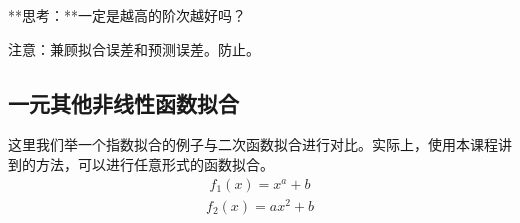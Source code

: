 \documentclass[letterpaper,10pt,english]{sphinxmanual}
\begin{document}
\noindent{}

**思考：**一定是越高的阶次越好吗？


注意：兼顾拟合误差和预测误差。防止。


\subsection{一元其他非线性函数拟合}
\label{\detokenize{docs/prediction_model:id9}}
这里我们举一个指数拟合的例子与二次函数拟合进行对比。实际上，使用本课程讲到的方法，可以进行任意形式的函数拟合。
\begin{equation*}
\begin{split}
f_1(x) = x^a + b
\end{split}
\end{equation*}\begin{equation*}
\begin{split}
f_2(x) = ax^2 + b
\end{split}
\end{equation*}
\end{document}
